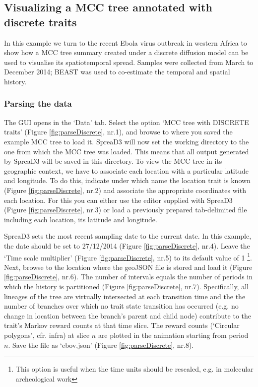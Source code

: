 \documentclass[english]{paper}
\begin{document}
\subsection{Visualizing a MCC tree annotated with discrete traits}
% 

In this example we turn to the recent Ebola virus outbreak in western Africa to show how a MCC tree summary created under a discrete diffusion model \citep{lemey:2009fk} can be used to visualise its spatiotemporal spread. 
Samples were collected from March to December 2014; BEAST \citep{drummond:2012zr} was used to co-estimate the temporal and spatial history. 

\subsubsection{Parsing the data}
The GUI opens in the `Data' tab.
Select the option `MCC tree with DISCRETE traits' (Figure \ref{fig:parseDiscrete}, nr.1), and browse to where you saved the example MCC tree to load it.
SpreaD3 will now set the working directory to the one from which the MCC tree was loaded. 
This means that all output generated by SpreaD3 will be saved in this directory.
To view the MCC tree in its geographic context, we have to associate each location with a particular latitude and longitude. 
To do this, indicate under which name the location trait is known (Figure \ref{fig:parseDiscrete}, nr.2) and associate the appropriate coordinates with each location.
For this you can either use the editor supplied with SpreaD3 (Figure \ref{fig:parseDiscrete}, nr.3) or load a previously prepared tab-delimited file including each location, its latitude and longitude. 
\par
SpreaD3 sets the most recent sampling date to the current date. 
In this example, the date should be set to 27/12/2014 (Figure \ref{fig:parseDiscrete}, nr.4).
Leave the `Time scale multiplier' (Figure \ref{fig:parseDiscrete}, nr.5) to its default value of 1 \footnote{This option is useful when the time units should be rescaled,  e.g. in molecular archeological work}. 
Next, browse to the location where the geoJSON file is stored and load it (Figure \ref{fig:parseDiscrete}, nr.6).
The number of intervals equals the number of periods in which the history is partitioned (Figure \ref{fig:parseDiscrete}, nr.7). %
Specifically, all lineages of the tree are virtually intersected at each transition time and the the number of branches over which no trait state transition has occurred (e.g. no change in location between the branch's parent and child node) contribute to the trait's Markov reward counts at that time slice.
The reward counts (`Circular polygons', cfr. infra) at slice $n$ are plotted in the animation starting from period $n$.
Save the file as `ebov.json' (Figure \ref{fig:parseDiscrete}, nr.8).
\end{document}

